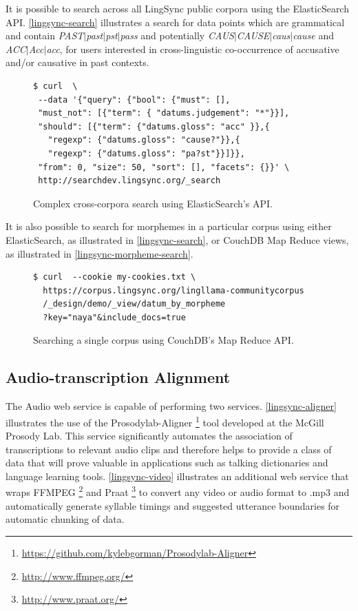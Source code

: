\documentclass[11pt]{article}
\begin{document}
It is possible to search across all LingSync public corpora using the
ElasticSearch API. \autoref{lingsync-search} illustrates a search for data
points which are grammatical and contain \textit{PAST$|$past$|$pst$|$pass} and
potentially \textit{CAUS$|$CAUSE$|$caus$|$cause} and \textit{ACC$|$Acc$|$acc},
for users interested in cross-linguistic co-occurrence of accusative and/or
causative in past contexts.

\begin{figure}[h]
\scriptsize
\begin{verbatim}
$ curl  \
 --data '{"query": {"bool": {"must": [],
 "must_not": [{"term": { "datums.judgement": "*"}}],
 "should": [{"term": {"datums.gloss": "acc" }},{ 
   "regexp": {"datums.gloss": "cause?"}},{
   "regexp": {"datums.gloss": "pa?st"}}]}},
 "from": 0, "size": 50, "sort": [], "facets": {}}' \
 http://searchdev.lingsync.org/_search
\end{verbatim}
\normalsize
\caption{Complex cross-corpora search using ElasticSearch's API.}
\label{lingsync-search}
\end{figure}




It is also possible to search for morphemes in a particular corpus using either
ElasticSearch, as illustrated in \autoref{lingsync-search}, or CouchDB Map
Reduce views, as illustrated in \autoref{lingsync-morpheme-search}.

\begin{figure}[h]
\scriptsize
\begin{verbatim}
$ curl  --cookie my-cookies.txt \
  https://corpus.lingsync.org/lingllama-communitycorpus
  /_design/demo/_view/datum_by_morpheme
  ?key="naya"&include_docs=true
\end{verbatim}
\normalsize
\caption{Searching a single corpus using CouchDB's Map Reduce API.}
\label{lingsync-morpheme-search}
\end{figure}



\subsection{Audio-transcription Alignment}
The Audio web service is capable of performing two services.
\autoref{lingsync-aligner} illustrates the use of the
Prosodylab-Aligner%
\footnote{\url{https://github.com/kylebgorman/Prosodylab-Aligner}} %
tool developed at the McGill Prosody Lab. This service significantly automates
the association of transcriptions to relevant audio clips and therefore helps
to provide a class of data that will prove valuable in applications such as
talking dictionaries and language learning tools. \autoref{lingsync-video}
illustrates an additional web service that wraps
FFMPEG%
\footnote{\url{http://www.ffmpeg.org/}} %
and Praat%
\footnote{\url{http://www.praat.org/}} %
to convert any video or audio format to .mp3 and automatically generate
syllable timings and suggested utterance boundaries for automatic chunking of
data.
\end{document}
